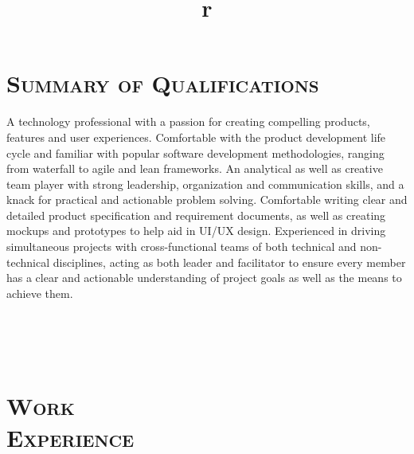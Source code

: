\begin{resume}


\section{\textsc{Summary of Qualifications}}
A technology professional with a passion for creating compelling products, features and user experiences. Comfortable with the product development life cycle and familiar with popular software development methodologies, ranging from waterfall to agile and lean frameworks. An analytical as well as creative team player with strong leadership, organization and communication skills, and a knack for practical and actionable problem solving. Comfortable writing clear and detailed product specification and requirement documents, as well as creating mockups and prototypes to help aid in UI/UX design. Experienced in driving simultaneous projects with cross-functional teams of both technical and non-technical disciplines, acting as both leader and facilitator to ensure every member has a clear and actionable understanding of project goals as well as the means to achieve them.





\begin{formatb}
  	\title{r}\\
	\\
	\body\\
\end{formatb}

\section{\textsc{Work\\Experience}}



\end{resume}
